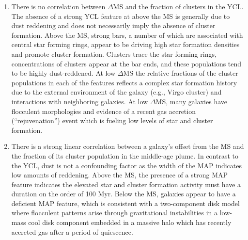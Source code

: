 \documentclass[linenumbers]{aastex63}
\begin{document}
{\begin{enumerate}
\item There is no correlation between $\Delta$MS and the fraction of clusters in the YCL. The absence of a strong YCL feature at above the MS is generally due to dust reddening and does not necessarily imply the absence of cluster formation.  Above the MS, strong bars, a number of which are associated with central star forming rings, appear to be driving high star formation densities and promote cluster formation. Clusters trace the star forming rings, concentrations of clusters appear at the bar ends, and these populations tend to be highly dust-reddened.  At low $\Delta$MS the relative fractions of the cluster populations in each of the features reflects a complex star formation history due to the external environment of the galaxy (e.g., Virgo cluster) and interactions with neighboring galaxies.  At low $\Delta$MS, many galaxies have flocculent morphologies and evidence of a recent gas accretion (``rejuvenation'') event which is fueling low levels of star and cluster formation.  
\item  There is a strong linear correlation between a galaxy's offset from the MS and the fraction of its cluster population in the middle-age plume.  In contrast to the YCL, dust is not a confounding factor as the width of the MAP indicates low amounts of reddening.  Above the MS, the presence of a strong MAP feature indicates the elevated star and cluster formation activity must have a duration on the order of 100 Myr.  Below the MS, galaxies appear to have a deficient MAP feature, which is consistent with a two-component disk model where flocculent patterns arise through gravitational instabilities in a low-mass cool disk component embedded in
a massive halo which has recently accreted gas after a period of quiescence.    




\end{enumerate}}
\end{document}
